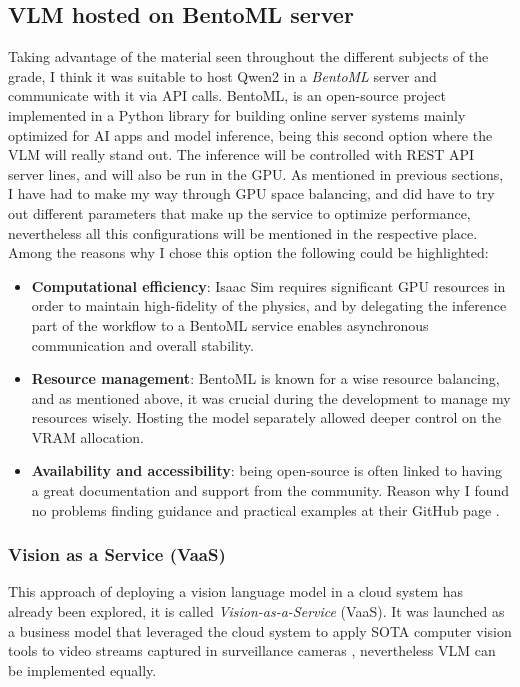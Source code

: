 \subsection{VLM hosted on BentoML server}
Taking advantage of the material seen throughout the different subjects of the grade, I think it was suitable to host Qwen2 in a \textit{BentoML} server and communicate with it via API calls. BentoML, is an open-source project implemented in a Python library for building online server systems mainly optimized for AI apps and model inference, being this second option where the VLM will really stand out. The inference will be controlled with REST API server lines, and will also be run in the GPU. As mentioned in previous sections, I have had to make my way through GPU space balancing, and did have to try out different parameters that make up the service to optimize performance, nevertheless all this configurations will be mentioned in the respective place. Among the reasons why I chose this option the following could be highlighted: 

\begin{itemize}
	\item \textbf{Computational efficiency}: Isaac Sim requires significant GPU resources in order to maintain high-fidelity of the physics, and by delegating the inference part of the workflow to a BentoML service enables asynchronous communication and overall stability. 
	
	\item \textbf{Resource management}: BentoML is known for a wise resource balancing, and as mentioned above, it was crucial during the development to manage my resources wisely. Hosting the model separately allowed deeper control on the VRAM allocation.
	
	\item \textbf{Availability and accessibility}: being open-source is often linked to having a great documentation and support from the community. Reason why I found no problems finding guidance and practical examples at their GitHub page \cite{BentoML_2024}.
\end{itemize}

\subsubsection{Vision as a Service (VaaS)}
This approach of deploying a vision language model in a cloud system has already been explored, it is called \textit{Vision-as-a-Service} (VaaS). It was launched as a business model that leveraged the cloud system to apply SOTA computer vision tools to video streams captured in surveillance cameras \cite{EdgeAIVision2015}, nevertheless VLM can be implemented equally.


